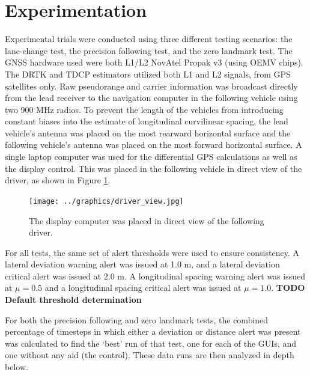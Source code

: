 \documentclass[twocolumn,10pt]{article}
\begin{document}

\section*{Experimentation}

  Experimental trials were conducted using three different testing scenarios: the lane-change test, the precision following test, and the zero landmark test.  
  The GNSS hardware used were both L1/L2 NovAtel Propak v3 (using OEMV chips). The DRTK and TDCP estimators utilized both L1 and L2 signals, from GPS satellites only.  Raw pseudorange and carrier information was broadcast directly from the lead receiver to the navigation computer in the following vehicle using two 900 MHz radios. To prevent the length of the vehicles from introducing constant biases into the estimate of longitudinal curvilinear spacing, the lead vehicle's antenna was placed on the most rearward horizontal surface and the following vehicle's antenna was placed on the most forward horizontal surface.
  A single laptop computer was used for the differential GPS calculations as well as the display control. This was placed in the following vehicle in direct view of the driver, as shown in Figure \ref{fig:driver_view}.

  \begin{figure}[ht] \centering
    \texttt{[image: ../graphics/driver\_view.jpg]}
    \caption{The display computer was placed in direct view of the following driver.}
    \label{fig:driver_view}
  \end{figure}

  For all tests, the same set of alert thresholds were used to ensure consistency. A lateral deviation warning alert was issued at 1.0 m, and a lateral deviation critical alert was issued at 2.0 m. A longitudinal spacing warning alert was issued at $\mu = 0.5$ and a longitudinal spacing critical alert was issued at $\mu=1.0$.
  \textbf{TODO Default threshold determination}

  For both the precision following and zero landmark tests, the combined percentage of timesteps in which either a deviation or distance alert was present was calculated to find the `best' run of that test, one for each of the GUIs, and one without any aid (the control). These data runs are then analyzed in depth below.
\end{document}
